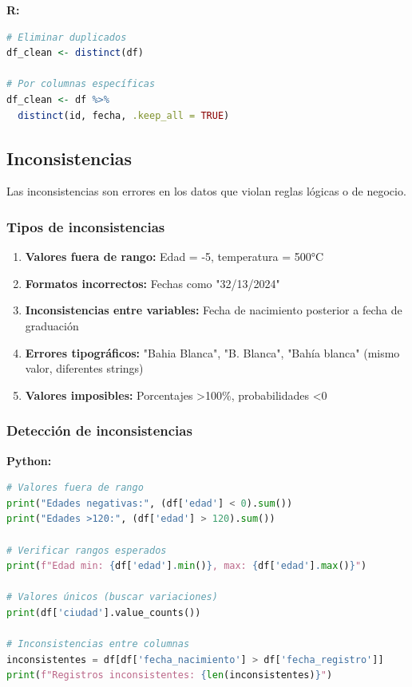 \documentclass[a4paper,11pt]{article}
\begin{document}
\textbf{R:}
\begin{lstlisting}[language=R]
# Eliminar duplicados
df_clean <- distinct(df)

# Por columnas específicas
df_clean <- df %>%
  distinct(id, fecha, .keep_all = TRUE)
\end{lstlisting}

\subsection{Inconsistencias}

Las inconsistencias son errores en los datos que violan reglas lógicas o de negocio.

\subsubsection{Tipos de inconsistencias}

\begin{enumerate}
    \item \textbf{Valores fuera de rango:} Edad = -5, temperatura = 500°C
    \item \textbf{Formatos incorrectos:} Fechas como "32/13/2024"
    \item \textbf{Inconsistencias entre variables:} Fecha de nacimiento posterior a fecha de graduación
    \item \textbf{Errores tipográficos:} "Bahia Blanca", "B. Blanca", "Bahía blanca" (mismo valor, diferentes strings)
    \item \textbf{Valores imposibles:} Porcentajes >100\%, probabilidades <0
\end{enumerate}

\subsubsection{Detección de inconsistencias}

\textbf{Python:}
\begin{lstlisting}[language=Python]
# Valores fuera de rango
print("Edades negativas:", (df['edad'] < 0).sum())
print("Edades >120:", (df['edad'] > 120).sum())

# Verificar rangos esperados
print(f"Edad min: {df['edad'].min()}, max: {df['edad'].max()}")

# Valores únicos (buscar variaciones)
print(df['ciudad'].value_counts())

# Inconsistencias entre columnas
inconsistentes = df[df['fecha_nacimiento'] > df['fecha_registro']]
print(f"Registros inconsistentes: {len(inconsistentes)}")
\end{lstlisting}
\end{document}

